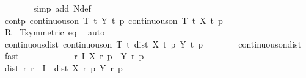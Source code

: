 \begin{isabellebody}
\ \ \ \ \ \ \isamarkupfalse%
\ {\isacharparenleft}{\kern0pt}simp\ add{\isacharcolon}{\kern0pt}\ N{\isacharunderscore}{\kern0pt}def{\isacharparenright}{\kern0pt}\isanewline
\ \ \ \ \isamarkupfalse%
\ cont{\isacharunderscore}{\kern0pt}p{\isacharcolon}{\kern0pt}\ {\isachardoublequoteopen}continuous{\isacharunderscore}{\kern0pt}on\ {\isacharbraceleft}{\kern0pt}{}{\isachardot}{\kern0pt}{\isachardot}{\kern0pt}T{\isacharbraceright}{\kern0pt}\ {\isacharparenleft}{\kern0pt}{\isasymlambda}t{\isachardot}{\kern0pt}\ Y\ t\ p{\isacharparenright}{\kern0pt}{\isachardoublequoteclose}\ {\isachardoublequoteopen}continuous{\isacharunderscore}{\kern0pt}on\ {\isacharbraceleft}{\kern0pt}{}{\isachardot}{\kern0pt}{\isachardot}{\kern0pt}T{\isacharbraceright}{\kern0pt}\ {\isacharparenleft}{\kern0pt}{\isasymlambda}t{\isachardot}{\kern0pt}\ X\ t\ p{\isacharparenright}{\kern0pt}{\isachardoublequoteclose}\isanewline
\ \ \ \ \ \ \isamarkupfalse%
\ R\ {\isacharasterisk}{\kern0pt}{\isacharparenleft}{\kern0pt}{}{\isacharparenright}{\kern0pt}\ T{\isacharparenleft}{\kern0pt}{}{\isacharparenright}{\kern0pt}{\isacharbrackleft}{\kern0pt}symmetric{\isacharbrackright}{\kern0pt}\ eq{\isacharparenleft}{\kern0pt}{}{\isacharparenright}{\kern0pt}\ \isamarkupfalse%
\ auto\isanewline
\ \ \ \ \isamarkupfalse%
\ \isamarkupfalse%
\ continuous{\isacharunderscore}{\kern0pt}dist{\isacharcolon}{\kern0pt}\ {\isachardoublequoteopen}continuous{\isacharunderscore}{\kern0pt}on\ {\isacharbraceleft}{\kern0pt}{}{\isachardot}{\kern0pt}{\isachardot}{\kern0pt}T{\isacharbraceright}{\kern0pt}\ {\isacharparenleft}{\kern0pt}{\isasymlambda}t{\isachardot}{\kern0pt}\ dist\ {\isacharparenleft}{\kern0pt}X\ t\ p{\isacharparenright}{\kern0pt}\ {\isacharparenleft}{\kern0pt}Y\ t\ p{\isacharparenright}{\kern0pt}{\isacharparenright}{\kern0pt}{\isachardoublequoteclose}\isanewline
\ \ \ \ \ \ \isamarkupfalse%
\ continuous{\isacharunderscore}{\kern0pt}on{\isacharunderscore}{\kern0pt}dist\ \isamarkupfalse%
\ fast\isanewline
\ \ \ \ \isacommand{{\isacharbraceleft}{\kern0pt}}\isamarkupfalse%
\isanewline
\ \ \ \ \ \ \isamarkupfalse%
\ {\isachardoublequoteopen}{\isasymforall}r{\isasymin}\ {\isacharquery}{\kern0pt}I{\isachardot}{\kern0pt}\ X\ r\ p\ {\isacharequal}{\kern0pt}\ Y\ r\ p{\isachardoublequoteclose}\isanewline
\ \ \ \ \ \ \isamarkupfalse%
\ \isamarkupfalse%
\ dist{\isacharunderscore}{\kern0pt}{}{\isacharcolon}{\kern0pt}\ {\isachardoublequoteopen}{\isasymAnd}r{\isachardot}{\kern0pt}\ r\ {\isasymin}\ {\isacharquery}{\kern0pt}I\ {\isasymLongrightarrow}\ dist\ {\isacharparenleft}{\kern0pt}X\ r\ p{\isacharparenright}{\kern0pt}\ {\isacharparenleft}{\kern0pt}Y\ r\ p{\isacharparenright}{\kern0pt}\ {\isacharequal}{\kern0pt}\ {}{\isachardoublequoteclose}\isanewline

\end{isabellebody}
